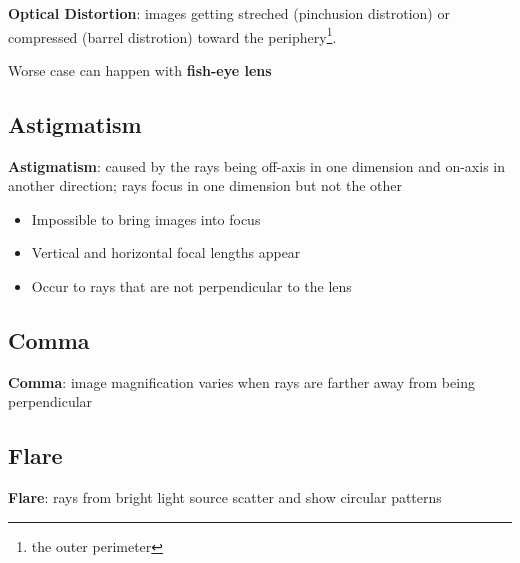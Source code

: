   \textbf{Optical Distortion}: images getting streched (pinchusion distrotion)
  or compressed (barrel distrotion) toward the
  periphery\footnote{the outer perimeter}.

  Worse case can happen with \textbf{fish-eye lens}

\subsection{Astigmatism}

  \textbf{Astigmatism}: caused by the rays being off-axis in one dimension
  and on-axis in another direction; rays focus in one dimension but not the
  other

  \begin{itemize}
    \item Impossible to bring images into focus
    \item Vertical and horizontal focal lengths appear
    \item Occur to rays that are not perpendicular to the lens
  \end{itemize}

\subsection{Comma}

  \textbf{Comma}: image magnification varies when rays are farther away
  from being perpendicular

\subsection{Flare}

  \textbf{Flare}: rays from bright light source scatter and show circular
  patterns
